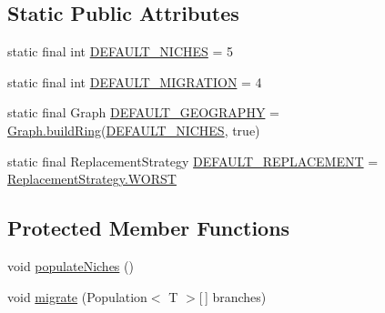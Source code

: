 \subsection*{Static Public Attributes}
\begin{DoxyCompactItemize}
\item 
static final int \hyperlink{classjenes_1_1algorithms_1_1_island_g_a_3_01_t_01extends_01_chromosome_01_4_a37c9c99c1181aa1f194ad610bdb4d25f}{D\-E\-F\-A\-U\-L\-T\-\_\-\-N\-I\-C\-H\-E\-S} = 5
\item 
static final int \hyperlink{classjenes_1_1algorithms_1_1_island_g_a_3_01_t_01extends_01_chromosome_01_4_a114bd755cf3def2fffb318ab4f40569a}{D\-E\-F\-A\-U\-L\-T\-\_\-\-M\-I\-G\-R\-A\-T\-I\-O\-N} = 4
\item 
static final Graph \hyperlink{classjenes_1_1algorithms_1_1_island_g_a_3_01_t_01extends_01_chromosome_01_4_ae27b28d3f2b4f90898a4cc90a9bd1bd9}{D\-E\-F\-A\-U\-L\-T\-\_\-\-G\-E\-O\-G\-R\-A\-P\-H\-Y} = \hyperlink{classjenes_1_1algorithms_1_1_island_g_a_3_01_t_01extends_01_chromosome_01_4_1_1_graph_afbb83bf011aa8a8c36be798322c92b8a}{Graph.\-build\-Ring}(\hyperlink{classjenes_1_1algorithms_1_1_island_g_a_3_01_t_01extends_01_chromosome_01_4_a37c9c99c1181aa1f194ad610bdb4d25f}{D\-E\-F\-A\-U\-L\-T\-\_\-\-N\-I\-C\-H\-E\-S}, true)
\item 
static final Replacement\-Strategy \hyperlink{classjenes_1_1algorithms_1_1_island_g_a_3_01_t_01extends_01_chromosome_01_4_a1fc6944fd99215488896c76893d5f3d0}{D\-E\-F\-A\-U\-L\-T\-\_\-\-R\-E\-P\-L\-A\-C\-E\-M\-E\-N\-T} = \hyperlink{enumjenes_1_1algorithms_1_1_island_g_a_3_01_t_01extends_01_chromosome_01_4_1_1_replacement_strategy_a7c1f4683ed158cfaf0d6e21ce739bdea}{Replacement\-Strategy.\-W\-O\-R\-S\-T}
\end{DoxyCompactItemize}
\subsection*{Protected Member Functions}
\begin{DoxyCompactItemize}
\item 
void \hyperlink{classjenes_1_1algorithms_1_1_island_g_a_3_01_t_01extends_01_chromosome_01_4_afdd01d6051280db25af39a8382a48239}{populate\-Niches} ()
\item 
void \hyperlink{classjenes_1_1algorithms_1_1_island_g_a_3_01_t_01extends_01_chromosome_01_4_a73312f19002cfeb0daf1f66e4eeccbd9}{migrate} (Population$<$ T $>$\mbox{[}$\,$\mbox{]} branches)
\end{DoxyCompactItemize}
